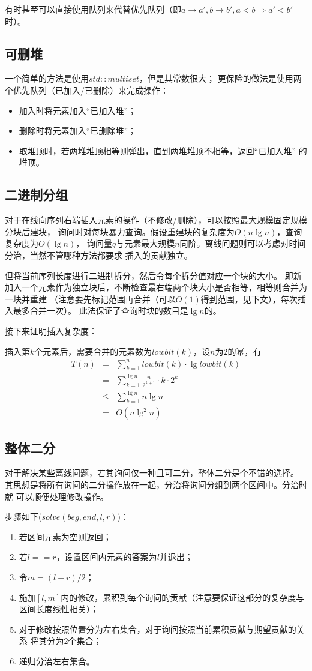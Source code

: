 有时甚至可以直接使用队列来代替优先队列（即$a\rightarrow a',b\rightarrow b',
a<b\Rightarrow a'<b'$时）。
\subsection{可删堆}\label{MultiSet}
一个简单的方法是使用$std::multiset$，但是其常数很大；
更保险的做法是使用两个优先队列（已加入/已删除）来完成操作：
\begin{itemize}
	\item 加入时将元素加入``已加入堆''；
	\item 删除时将元素加入``已删除堆''；
	\item 取堆顶时，若两堆堆顶相等则弹出，直到两堆堆顶不相等，返回``已加入堆''
	      的堆顶。
\end{itemize}
\subsection{二进制分组}
对于在线向序列右端插入元素的操作（不修改/删除），可以按照最大规模固定规模分块后建块，
询问时对每块暴力查询。假设重建块的复杂度为$O(n\lg n)$，查询复杂度为$O(\lg n)$，
询问量$q$与元素最大规模$n$同阶。离线问题则可以考虑对时间分治，当然不管哪种方法都要求
插入的贡献独立。

但将当前序列长度进行二进制拆分，然后令每个拆分值对应一个块的大小。
即新加入一个元素作为独立块后，不断检查最右端两个块大小是否相等，相等则合并为一块并重建
（注意要先标记范围再合并（可以$O(1)$得到范围，见下文），每次插入最多合并一次）。
此法保证了查询时块的数目是$\lg n$的。

接下来证明插入复杂度：

插入第$k$个元素后，需要合并的元素数为$lowbit(k)$，设$n$为$2$的幂，有
\begin{eqnarray*}
    T(n)&=&\sum_{k=1}^n {lowbit(k)\cdot \lg lowbit(k)}\\
        &=&\sum_{k=1}^{\lg n} {\frac{n}{2^{k+1}}\cdot k\cdot 2^k}\\
        &\leq&\sum_{k=1}^{\lg n} {n \lg n}\\
        &=&O(n\lg^2 n)
\end{eqnarray*}
\subsection{整体二分}
对于解决某些离线问题，若其询问仅一种且可二分，整体二分是个不错的选择。
其思想是将所有询问的二分操作放在一起，分治将询问分组到两个区间中。分治时就
可以顺便处理修改操作。

步骤如下($solve(beg,end,l,r)$)：
\begin{enumerate}
	\item 若区间元素为空则返回；
	\item 若$l==r$，设置区间内元素的答案为$l$并退出；
	\item 令$m=(l+r)/2$；
	\item 施加$[l,m]$内的修改，累积到每个询问的贡献（注意要保证这部分的复杂度与
	区间长度线性相关）；
	\item 对于修改按照位置分为左右集合，对于询问按照当前累积贡献与期望贡献的关系
	将其分为2个集合；
	\item 递归分治左右集合。
\end{enumerate}
